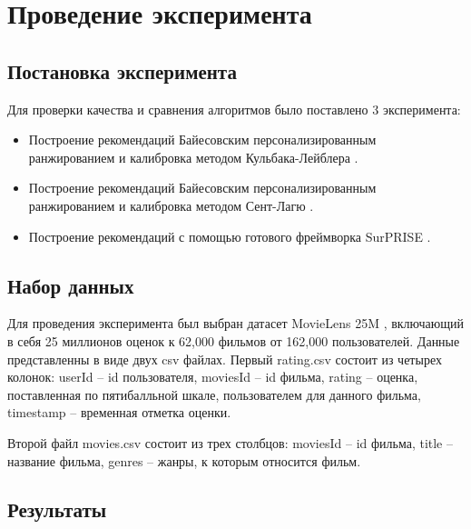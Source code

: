 \section{Проведение эксперимента}
\subsection{Постановка эксперимента}
Для проверки качества и сравнения алгоритмов было поставлено 3 эксперимента:
\begin{itemize}
   \item Построение рекомендаций Байесовским
   персонализированным ранжированием и калибровка методом Кульбака-Лейблера \cite{bib4}.
   \item Построение рекомендаций Байесовским
   персонализированным ранжированием и калибровка методом Сент-Лагю \cite{bib5}.
   \item Построение рекомендаций с помощью готового фреймворка SurPRISE \cite{sur}.
\end{itemize}
\subsection{Набор данных}
Для проведения эксперимента был выбран датасет MovieLens 25M \cite{voc3}, включающий в себя 25 миллионов оценок к 62,000 фильмов от 162,000 пользователей.
Данные представленны в виде двух csv файлах. Первый rating.csv состоит из
четырех колонок: userId -- id пользователя, moviesId -- id фильма, 
rating -- оценка, поставленная по пятибалльной шкале, пользователем для данного фильма,
timestamp -- временная отметка оценки.
   
Второй файл movies.csv состоит из трех столбцов: moviesId -- id фильма, 
title -- название фильма, genres -- жанры, к которым относится фильм.
\subsection{Результаты}

